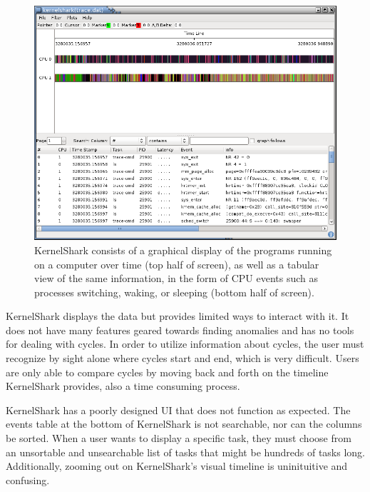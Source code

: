 \documentclass{hmcclinic}
\begin{document}
\begin{figure}[H]
  \centering
      \includegraphics[width=4.95in]{kshark-open.png}
  \caption{KernelShark consists of a graphical display of the programs running on a computer over time (top half of screen), as well as a tabular view of the same information, in the form of CPU events such as processes switching, waking, or sleeping (bottom half of screen).}
\end{figure}

KernelShark displays the data but provides limited ways to interact with it. It
does not have many features geared towards finding anomalies and has no tools for
dealing with cycles.  In order to utilize information about cycles, the user
must recognize by sight alone where cycles start and end, which is very
difficult. Users are only able to compare cycles by moving back and forth on
the timeline KernelShark provides, also a time consuming process.

KernelShark has a poorly designed UI that does not function as expected. The
events table at the bottom of KernelShark is not searchable, nor can the columns
be sorted. When a user wants to display a specific task, they must choose from
an unsortable and unsearchable list of tasks that might be hundreds of tasks
long. Additionally, zooming out on KernelShark's visual timeline is
uninituitive and confusing.

\end{document}
